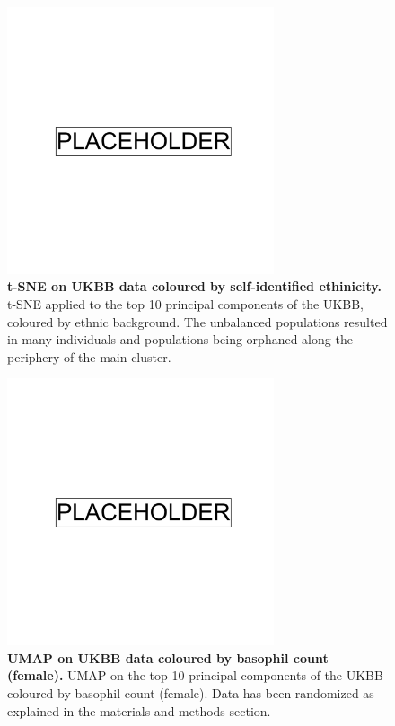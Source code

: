 \begin{figure}[!htb]
    \centering
    \includegraphics[width=0.7\textwidth]{placeholder.png}
    \caption[t-SNE on UKBB data coloured by self-identified ethinicity]{\textbf{t-SNE on UKBB data coloured by self-identified ethinicity.} t-SNE applied to the top 10 principal components of the UKBB, coloured by ethnic background. The unbalanced populations resulted in many individuals and populations being orphaned along the periphery of the main cluster.}
    \label{fig:supp_ukbb_tsne}
\end{figure}

\begin{figure}[ht]
    \centering
    \includegraphics[width=0.7\textwidth]{placeholder.png}
    \caption[UMAP on UKBB data coloured by basophil count (female)]{\textbf{UMAP on UKBB data coloured by basophil count (female).} UMAP on the top 10 principal components of the UKBB coloured by basophil count (female). Data has been randomized as explained in the materials and methods section.}
    \label{fig:supp_ukbb_basophill_f}
\end{figure}

